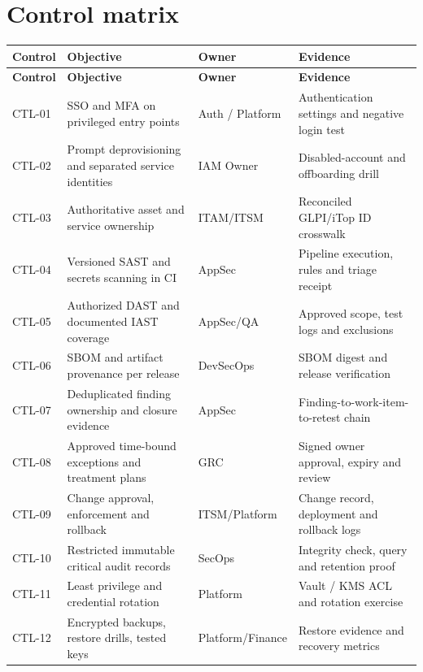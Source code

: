 \documentclass[10pt,letterpaper]{article}
\begin{document}
\section{Control matrix}
\small\begin{longtable}{>{\raggedright\arraybackslash}p{}>{\raggedright\arraybackslash}p{}>{\raggedright\arraybackslash}p{}>{\raggedright\arraybackslash}p{}}
\toprule
\textbf{Control} & \textbf{Objective} & \textbf{Owner} & \textbf{Evidence}\\
\midrule\endfirsthead
\toprule
\textbf{Control} & \textbf{Objective} & \textbf{Owner} & \textbf{Evidence}\\
\midrule\endhead
CTL-01 & SSO and MFA on privileged entry points & Auth / Platform & Authentication settings and negative login test\\
CTL-02 & Prompt deprovisioning and separated service identities & IAM Owner & Disabled-account and offboarding drill\\
CTL-03 & Authoritative asset and service ownership & ITAM/ITSM & Reconciled GLPI/iTop ID crosswalk\\
CTL-04 & Versioned SAST and secrets scanning in CI & AppSec & Pipeline execution, rules and triage receipt\\
CTL-05 & Authorized DAST and documented IAST coverage & AppSec/QA & Approved scope, test logs and exclusions\\
CTL-06 & SBOM and artifact provenance per release & DevSecOps & SBOM digest and release verification\\
CTL-07 & Deduplicated finding ownership and closure evidence & AppSec & Finding-to-work-item-to-retest chain\\
CTL-08 & Approved time-bound exceptions and treatment plans & GRC & Signed owner approval, expiry and review\\
CTL-09 & Change approval, enforcement and rollback & ITSM/Platform & Change record, deployment and rollback logs\\
CTL-10 & Restricted immutable critical audit records & SecOps & Integrity check, query and retention proof\\
CTL-11 & Least privilege and credential rotation & Platform & Vault / KMS ACL and rotation exercise\\
CTL-12 & Encrypted backups, restore drills, tested keys & Platform/Finance & Restore evidence and recovery metrics\\

\end{longtable}
\end{document}
